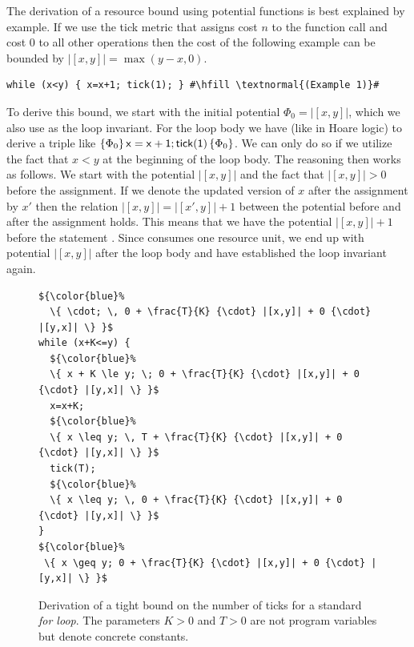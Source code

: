 \documentclass{sigplanconf}
\begin{document}
The derivation of a resource bound using potential functions is best
explained by example.  If we use the tick metric that assigns cost $n$
to the function call  and cost $0$ to all other
operations then the cost of the following example can be bounded by
$|[x,y]| = \max(y{-}x,0)$.%
\begin{lstlisting}[basicstyle=\tt\small]
while (x<y) { x=x+1; tick(1); } #\hfill \textnormal{(Example 1)}#
\end{lstlisting}
To derive this bound, we start with the initial potential $\Phi_0 =
|[x,y]|$, which
we also use as the loop invariant.  For the loop body we have (like in
Hoare logic) to derive a triple like
$\{\Phi_0\}\, \mathsf{x=x+1;tick(1)}\, \{\Phi_0\}$.  We can only do so
if we utilize the fact that $x<y$ at the beginning of the loop body.
The reasoning then works as follows. We start with the potential
$|[x,y]|$ and the fact that $|[x,y]| > 0$ before the assignment.  If
we denote the updated version of $x$ after the assignment by $x'$ then
the relation $|[x,y]| = |[x',y]| + 1$ between the potential before and
after the assignment  holds.  This means that we have the
potential $|[x,y]| + 1$ before the statement .  Since
 consumes one resource unit, we end up with potential
$|[x,y]|$ after the loop body and have established the loop invariant
again.



\begin{figure}[t]
  \centering
\vspace{-1.5ex}
\begin{lstlisting}[mathescape]
${\color{blue}%
  \{ \cdot; \, 0 + \frac{T}{K} {\cdot} |[x,y]| + 0 {\cdot} |[y,x]| \} }$
while (x+K<=y) {
  ${\color{blue}%
  \{ x + K \le y; \; 0 + \frac{T}{K} {\cdot} |[x,y]| + 0 {\cdot} |[y,x]| \} }$
  x=x+K;
  ${\color{blue}%
  \{ x \leq y; \, T + \frac{T}{K} {\cdot} |[x,y]| + 0 {\cdot} |[y,x]| \} }$
  tick(T);
  ${\color{blue}%
  \{ x \leq y; \, 0 + \frac{T}{K} {\cdot} |[x,y]| + 0 {\cdot} |[y,x]| \} }$
}
${\color{blue}%
 \{ x \geq y; 0 + \frac{T}{K} {\cdot} |[x,y]| + 0 {\cdot} |[y,x]| \} }$
\end{lstlisting}
  \caption{Derivation of a tight bound on the number of
    ticks for a standard \emph{for loop}.  The parameters $K>0$ and
    $T>0$ are not program variables but denote concrete constants.
  }
  \label{fig:ex1}
\end{figure}
\end{document}
